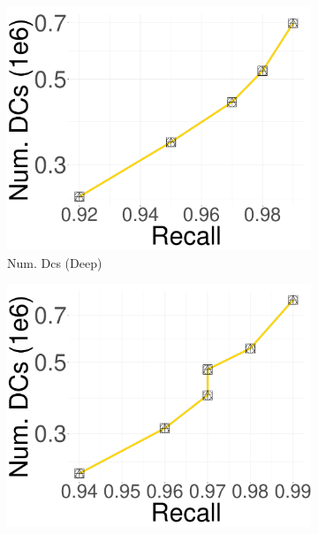 \begin{figure}[htbp]
    \begin{subfigure}[b]{0.2325\textwidth}
        \captionsetup{justification=centering}
	\centering	
        \includegraphics[width=\textwidth]{../img/oigas/PQVSPQS/25GB/deep_10_DC.pdf}
        \caption{Num. Dcs (Deep)}
        \label{fig:hnswdpa:25:25GB_Deep_DC}
    \end{subfigure}
    \begin{subfigure}[b]{0.2325\textwidth}
        \captionsetup{justification=centering}
	\centering	
        \includegraphics[width=\textwidth]{../img/oigas/PQVSPQS/25GB/sift_10_DC.pdf}

\end{subfigure}
\end{figure}
